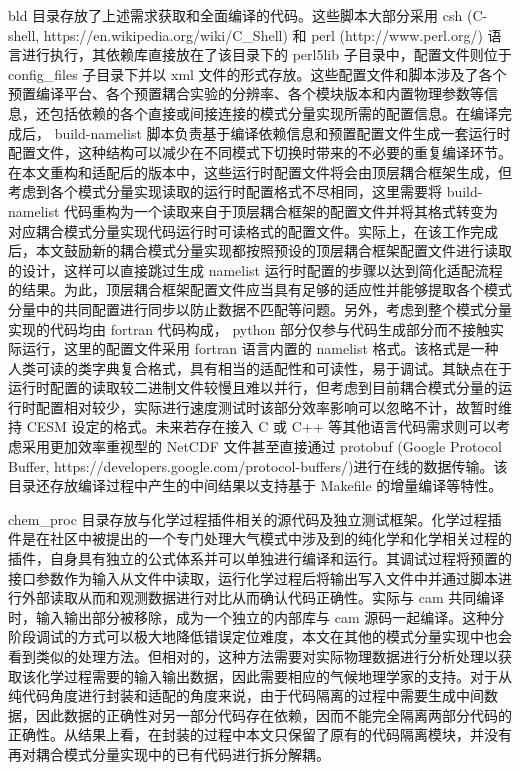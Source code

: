 bld 目录存放了上述需求获取和全面编译的代码。这些脚本大部分采用 csh (C-shell, https://en.wikipedia.org/wiki/C\_Shell) 和 perl (http://www.perl.org/) 语言进行执行，其依赖库直接放在了该目录下的 perl5lib 子目录中，配置文件则位于 config\_files 子目录下并以 xml 文件的形式存放。这些配置文件和脚本涉及了各个预置编译平台、各个预置耦合实验的分辨率、各个模块版本和内置物理参数等信息，还包括依赖的各个直接或间接连接的模式分量实现所需的配置信息。在编译完成后， build-namelist 脚本负责基于编译依赖信息和预置配置文件生成一套运行时配置文件，这种结构可以减少在不同模式下切换时带来的不必要的重复编译环节。在本文重构和适配后的版本中，这些运行时配置文件将会由顶层耦合框架生成，但考虑到各个模式分量实现读取的运行时配置格式不尽相同，这里需要将 build-namelist 代码重构为一个读取来自于顶层耦合框架的配置文件并将其格式转变为对应耦合模式分量实现代码运行时可读格式的配置文件。实际上，在该工作完成后，本文鼓励新的耦合模式分量实现都按照预设的顶层耦合框架配置文件进行读取的设计，这样可以直接跳过生成 namelist 运行时配置的步骤以达到简化适配流程的结果。为此，顶层耦合框架配置文件应当具有足够的适应性并能够提取各个模式分量中的共同配置进行同步以防止数据不匹配等问题。另外，考虑到整个模式分量实现的代码均由 fortran 代码构成， python 部分仅参与代码生成部分而不接触实际运行，这里的配置文件采用 fortran 语言内置的 namelist 格式。该格式是一种人类可读的类字典复合格式，具有相当的适配性和可读性，易于调试。其缺点在于运行时配置的读取较二进制文件较慢且难以并行，但考虑到目前耦合模式分量的运行时配置相对较少，实际进行速度测试时该部分效率影响可以忽略不计，故暂时维持 CESM 设定的格式。未来若存在接入 C 或 C++ 等其他语言代码需求则可以考虑采用更加效率重视型的 NetCDF 文件甚至直接通过 protobuf (Google Protocol Buffer, https://developers.google.com/protocol-buffers/)进行在线的数据传输。该目录还存放编译过程中产生的中间结果以支持基于 Makefile 的增量编译等特性。

chem\_proc 目录存放与化学过程插件相关的源代码及独立测试框架。化学过程插件是在社区中被提出的一个专门处理大气模式中涉及到的纯化学和化学相关过程的插件，自身具有独立的公式体系并可以单独进行编译和运行。其调试过程将预置的接口参数作为输入从文件中读取，运行化学过程后将输出写入文件中并通过脚本进行外部读取从而和观测数据进行对比从而确认代码正确性。实际与 cam 共同编译时，输入输出部分被移除，成为一个独立的内部库与 cam 源码一起编译。这种分阶段调试的方式可以极大地降低错误定位难度，本文在其他的模式分量实现中也会看到类似的处理方法。但相对的，这种方法需要对实际物理数据进行分析处理以获取该化学过程需要的输入输出数据，因此需要相应的气候地理学家的支持。对于从纯代码角度进行封装和适配的角度来说，由于代码隔离的过程中需要生成中间数据，因此数据的正确性对另一部分代码存在依赖，因而不能完全隔离两部分代码的正确性。从结果上看，在封装的过程中本文只保留了原有的代码隔离模块，并没有再对耦合模式分量实现中的已有代码进行拆分解耦。

